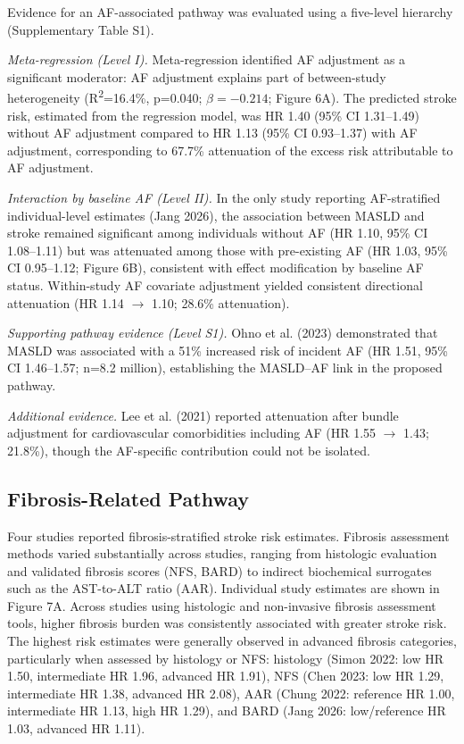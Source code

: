 \documentclass[12pt,a4paper]{article}
\begin{document}
Evidence for an AF-associated pathway was evaluated using a five-level hierarchy (Supplementary Table S1).

\textit{Meta-regression (Level I).} Meta-regression identified AF adjustment as a significant moderator: AF adjustment explains part of between-study heterogeneity (R\textsuperscript{2}=16.4\%, p=0.040; $\beta = -0.214$; Figure 6A). The predicted stroke risk, estimated from the regression model, was HR 1.40 (95\% CI 1.31--1.49) without AF adjustment compared to HR 1.13 (95\% CI 0.93--1.37) with AF adjustment, corresponding to 67.7\% attenuation of the excess risk attributable to AF adjustment.

\textit{Interaction by baseline AF (Level II).} In the only study reporting AF-stratified individual-level estimates (Jang 2026), the association between MASLD and stroke remained significant among individuals without AF (HR 1.10, 95\% CI 1.08--1.11) but was attenuated among those with pre-existing AF (HR 1.03, 95\% CI 0.95--1.12; Figure 6B), consistent with effect modification by baseline AF status. Within-study AF covariate adjustment yielded consistent directional attenuation (HR 1.14 $\rightarrow$ 1.10; 28.6\% attenuation).

\textit{Supporting pathway evidence (Level S1).} Ohno et al. (2023) demonstrated that MASLD was associated with a 51\% increased risk of incident AF (HR 1.51, 95\% CI 1.46--1.57; n=8.2 million), establishing the MASLD--AF link in the proposed pathway.

\textit{Additional evidence.} Lee et al. (2021) reported attenuation after bundle adjustment for cardiovascular comorbidities including AF (HR 1.55 $\rightarrow$ 1.43; 21.8\%), though the AF-specific contribution could not be isolated.

\subsection{Fibrosis-Related Pathway}

Four studies reported fibrosis-stratified stroke risk estimates. Fibrosis assessment methods varied substantially across studies, ranging from histologic evaluation and validated fibrosis scores (NFS, BARD) to indirect biochemical surrogates such as the AST-to-ALT ratio (AAR). Individual study estimates are shown in Figure 7A. Across studies using histologic and non-invasive fibrosis assessment tools, higher fibrosis burden was consistently associated with greater stroke risk. The highest risk estimates were generally observed in advanced fibrosis categories, particularly when assessed by histology or NFS: histology (Simon 2022: low HR 1.50, intermediate HR 1.96, advanced HR 1.91), NFS (Chen 2023: low HR 1.29, intermediate HR 1.38, advanced HR 2.08), AAR (Chung 2022: reference HR 1.00, intermediate HR 1.13, high HR 1.29), and BARD (Jang 2026: low/reference HR 1.03, advanced HR 1.11).
\end{document}
